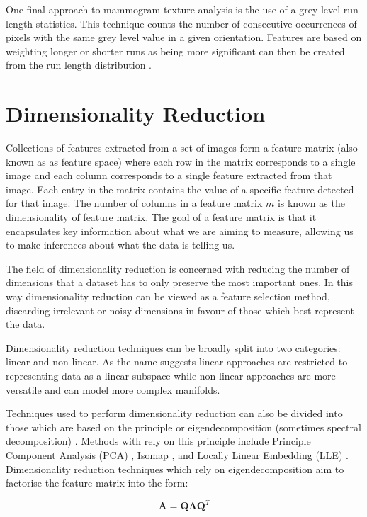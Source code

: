 One final approach to mammogram texture analysis is the use of a grey level run length statistics. This technique counts the number of consecutive occurrences of pixels with the same grey level value in a given orientation. Features are based on weighting longer or shorter runs as being more significant can then be created from the run length distribution \cite{weszka1976comparative, cheng2006approaches}.  

\section{Dimensionality Reduction}
Collections of features extracted from a set of images form a feature matrix (also known as as feature space) where each row in the matrix corresponds to a single image and each column corresponds to a single feature extracted from that image. Each entry in the matrix contains the value of a specific feature detected for that image. The number of columns in a feature matrix $m$ is known as the dimensionality of feature matrix. The goal of a feature matrix is that it encapsulates key information about what we are aiming to measure, allowing us to make inferences about what the data is telling us.

The field of dimensionality reduction is concerned with reducing the number of dimensions that a dataset has to only preserve the most important ones. In this way dimensionality reduction can be viewed as a feature selection method, discarding irrelevant or noisy dimensions in favour of those which best represent the data.

Dimensionality reduction techniques can be broadly split into two categories: linear and non-linear. As the name suggests linear approaches are restricted to representing data as a linear subspace while non-linear approaches are more versatile and can model more complex manifolds. 

Techniques used to perform dimensionality reduction can also be divided into those which are based on the principle or eigendecomposition (sometimes spectral decomposition)  \cite{strange2014open}. Methods with rely on this principle include Principle Component Analysis (PCA) \cite{shlens2014tutorial}, Isomap \cite{tenenbaum2000global}, and Locally Linear Embedding (LLE) \cite{roweis2000nonlinear} . Dimensionality reduction techniques which rely on eigendecomposition aim to factorise the feature matrix into the form:

\begin{equation}
	\bm{A} = \bm{Q}\bm{\Lambda}\bm{Q}^T
\end{equation}

